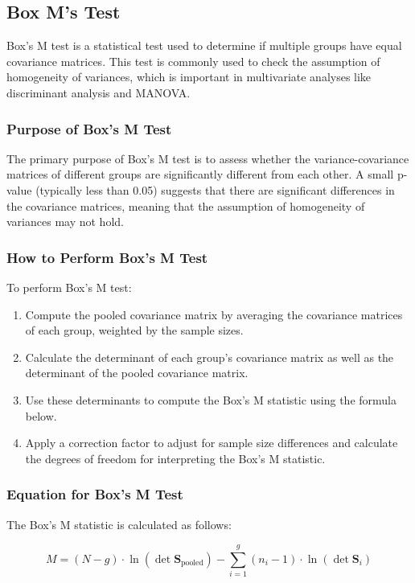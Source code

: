 \documentclass[11pt]{article}
\begin{document}
\subsection{Box M's Test}
Box's M test is a statistical test used to determine if multiple groups have equal covariance matrices. This test is commonly used to check the assumption of homogeneity of variances, which is important in multivariate analyses like discriminant analysis and MANOVA.

\subsubsection{Purpose of Box's M Test}
The primary purpose of Box's M test is to assess whether the variance-covariance matrices of different groups are significantly different from each other. A small p-value (typically less than 0.05) suggests that there are significant differences in the covariance matrices, meaning that the assumption of homogeneity of variances may not hold.

\subsubsection{How to Perform Box's M Test}
To perform Box's M test:
\begin{enumerate}
    \item Compute the pooled covariance matrix by averaging the covariance matrices of each group, weighted by the sample sizes.
    \item Calculate the determinant of each group’s covariance matrix as well as the determinant of the pooled covariance matrix.
    \item Use these determinants to compute the Box's M statistic using the formula below.
    \item Apply a correction factor to adjust for sample size differences and calculate the degrees of freedom for interpreting the Box's M statistic.
\end{enumerate}

\subsubsection{Equation for Box's M Test}
The Box's M statistic is calculated as follows:

\[
M = (N - g) \cdot \ln \left( \det \mathbf{S}_{\text{pooled}} \right) - \sum_{i=1}^{g} (n_i - 1) \cdot \ln \left( \det \mathbf{S}_i \right)
\]
\end{document}
